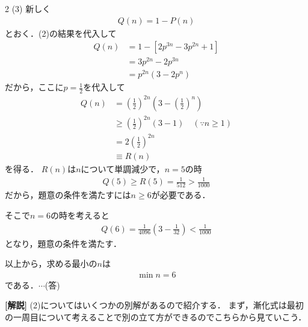 \documentclass[../../../../main.tex]{subfiles}
\begin{document}
\begin{multicols}{2}
  (3)
  新しく
  \begin{align*}
    Q(n) = 1-P(n)
  \end{align*}
  とおく．(2)の結果を代入して
  \begin{align*}
    Q(n)
     & = 1 - \left[2p^{3n}-3p^{2n}+1\right] \\
     & = 3p^{2n} - 2p^{3n}                  \\
     & = p^{2n}(3-2p^n)
  \end{align*}
  だから，ここに$p=\frac{1}{2}$を代入して
  \begin{align*}
    Q(n)
     & = \left(\frac{1}{2}\right)^{2n}\left(3-\left(\frac{1}{2}\right)^n\right)    \\
     & \ge \left(\frac{1}{2}\right)^{2n}\left(3-1\right)  \quad (\because n \ge 1) \\
     & = 2\left(\frac{1}{2}\right)^{2n}                                            \\
     & \equiv R(n)
  \end{align*}
  を得る．
  $R(n)$は$n$について単調減少で，$n=5$の時
  \begin{align*}
    Q(5) \ge R(5) = \frac{1}{512} > \frac{1}{1000}
  \end{align*}
  だから，題意の条件を満たすには$n \ge 6$が必要である．

  そこで$n=6$の時を考えると
  \begin{align*}
    Q(6) = \frac{1}{4096}\left(3-\frac{1}{32}\right) < \frac{1}{1000}
  \end{align*}
  となり，題意の条件を満たす．

  以上から，求める最小の$n$は
  \begin{align*}
    \min n = 6
  \end{align*}
  である．$\cdots$(答)

  \vspace{10pt}
  {\bf[解説]}
  (2)についてはいくつかの別解があるので紹介する．
  まず，漸化式は最初の一周目について考えることで別の立て方ができるのでこちらから見ていこう．


\end{multicols}
\end{document}
